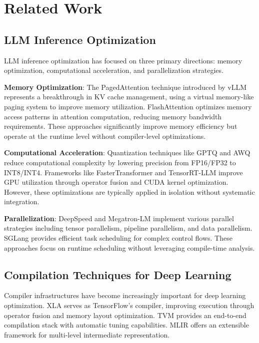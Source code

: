 \documentclass[conference]{IEEEtran}
\begin{document}

\section{Related Work}

\subsection{LLM Inference Optimization}

LLM inference optimization has focused on three primary directions: memory optimization, computational acceleration, and parallelization strategies.

\textbf{Memory Optimization}: The PagedAttention technique introduced by vLLM \cite{b3} represents a breakthrough in KV cache management, using a virtual memory-like paging system to improve memory utilization. FlashAttention \cite{b6} optimizes memory access patterns in attention computation, reducing memory bandwidth requirements. These approaches significantly improve memory efficiency but operate at the runtime level without compiler-level optimizations.

\textbf{Computational Acceleration}: Quantization techniques like GPTQ \cite{b7} and AWQ \cite{b8} reduce computational complexity by lowering precision from FP16/FP32 to INT8/INT4. Frameworks like FasterTransformer \cite{b9} and TensorRT-LLM \cite{b10} improve GPU utilization through operator fusion and CUDA kernel optimization. However, these optimizations are typically applied in isolation without systematic integration.

\textbf{Parallelization}: DeepSpeed \cite{b11} and Megatron-LM \cite{b12} implement various parallel strategies including tensor parallelism, pipeline parallelism, and data parallelism. SGLang \cite{b4} provides efficient task scheduling for complex control flows. These approaches focus on runtime scheduling without leveraging compile-time analysis.

\subsection{Compilation Techniques for Deep Learning}

Compiler infrastructures have become increasingly important for deep learning optimization. XLA \cite{b13} serves as TensorFlow's compiler, improving execution through operator fusion and memory layout optimization. TVM \cite{b14} provides an end-to-end compilation stack with automatic tuning capabilities. MLIR \cite{b5} offers an extensible framework for multi-level intermediate representation.
\end{document}
